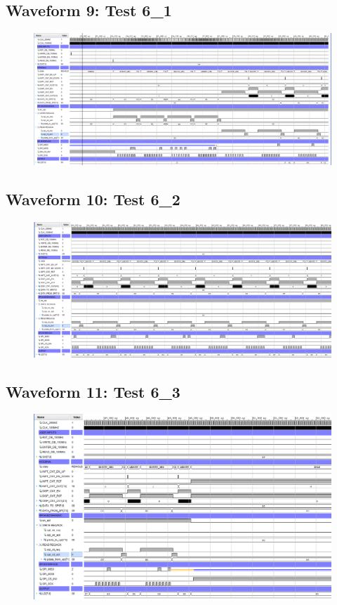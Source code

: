 \documentclass[11pt]{report}
\begin{document}
\subsection*{Waveform 9: Test 6\_1}
\begin{figure}[H]
    \includegraphics[width=\columnwidth]{Assets/Test6_1.PNG}
\end{figure}

\subsection*{Waveform 10: Test 6\_2}
\begin{figure}[H]
    \includegraphics[width=\columnwidth]{Assets/Test6_2.PNG}
\end{figure}

\subsection*{Waveform 11: Test 6\_3}
\begin{figure}[H]
    \includegraphics[width=\columnwidth]{Assets/Test6_3.PNG}
\end{figure}
\end{document}
